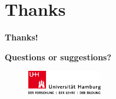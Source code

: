 
\section*{Thanks}

\begin{frame}
    
    \vspace{50pt}
    \centering
    
    \textbf{\Huge Thanks!}
    \vspace{30pt}

    \textbf{Questions or suggestions?}
    
    
    \vspace{20pt}
    \begin{figure}
      \centering\includegraphics[height=30pt]{assets/logo/uhh.pdf}
    \end{figure}
\end{frame}
